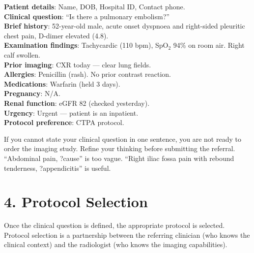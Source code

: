 \begin{testbox}
\textbf{Patient details}: Name, DOB, Hospital ID, Contact phone.\\
\textbf{Clinical question}: ``Is there a pulmonary embolism?''\\
\textbf{Brief history}: 52-year-old male, acute onset dyspnoea and right-sided pleuritic chest pain, D-dimer elevated (4.8).\\
\textbf{Examination findings}: Tachycardic (110 bpm), SpO$_2$ 94\% on room air. Right calf swollen.\\
\textbf{Prior imaging}: CXR today --- clear lung fields.\\
\textbf{Allergies}: Penicillin (rash). No prior contrast reaction.\\
\textbf{Medications}: Warfarin (held 3 days).\\
\textbf{Pregnancy}: N/A.\\
\textbf{Renal function}: eGFR 82 (checked yesterday).\\
\textbf{Urgency}: Urgent --- patient is an inpatient.\\
\textbf{Protocol preference}: CTPA protocol.
\end{testbox}

\begin{pearlbox}
If you cannot state your clinical question in one sentence, you are not ready to order the imaging study. Refine your thinking before submitting the referral. ``Abdominal pain, ?cause'' is too vague. ``Right iliac fossa pain with rebound tenderness, ?appendicitis'' is useful.
\end{pearlbox}


\section*{4. Protocol Selection}
Once the clinical question is defined, the appropriate protocol is selected. Protocol selection is a partnership between the referring clinician (who knows the clinical context) and the radiologist (who knows the imaging capabilities).

